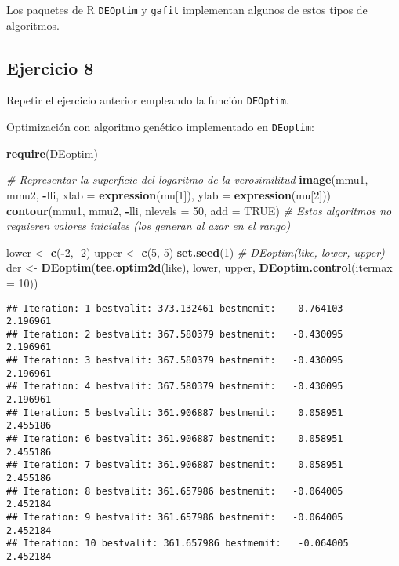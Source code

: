 \documentclass[
]{book}
\newenvironment{Shaded}{\begin{snugshade}}{\end{snugshade}}
\newcommand{\CommentTok}[1]{\textcolor[rgb]{0.56,0.35,0.01}{\textit{#1}}}
\newcommand{\DataTypeTok}[1]{\textcolor[rgb]{0.13,0.29,0.53}{#1}}
\newcommand{\DecValTok}[1]{\textcolor[rgb]{0.00,0.00,0.81}{#1}}
\newcommand{\KeywordTok}[1]{\textcolor[rgb]{0.13,0.29,0.53}{\textbf{#1}}}
\newcommand{\NormalTok}[1]{#1}
\newcommand{\OperatorTok}[1]{\textcolor[rgb]{0.81,0.36,0.00}{\textbf{#1}}}
\newcommand{\OtherTok}[1]{\textcolor[rgb]{0.56,0.35,0.01}{#1}}
\newcommand{\StringTok}[1]{\textcolor[rgb]{0.31,0.60,0.02}{#1}}
\theoremstyle{break}
\theoremstyle{definition}
\theoremstyle{definition}
\theoremstyle{definition}
\theoremstyle{remark}
\begin{document}
Los paquetes de R \texttt{DEOptim} y \texttt{gafit} implementan algunos de estos
tipos de algoritmos.

\hypertarget{ejercicio-8}{%
\subsection{Ejercicio 8}\label{ejercicio-8}}

Repetir el ejercicio anterior empleando la función \texttt{DEOptim}.

Optimización con algoritmo genético implementado en \texttt{DEoptim}:

\begin{Shaded}
\begin{Highlighting}[]
\KeywordTok{require}\NormalTok{(DEoptim)}

\CommentTok{# Representar la superficie del logaritmo de la verosimilitud}
\KeywordTok{image}\NormalTok{(mmu1, mmu2, }\OperatorTok{-}\NormalTok{lli, }\DataTypeTok{xlab =} \KeywordTok{expression}\NormalTok{(mu[}\DecValTok{1}\NormalTok{]), }\DataTypeTok{ylab =} \KeywordTok{expression}\NormalTok{(mu[}\DecValTok{2}\NormalTok{]))}
\KeywordTok{contour}\NormalTok{(mmu1, mmu2, }\OperatorTok{-}\NormalTok{lli, }\DataTypeTok{nlevels =} \DecValTok{50}\NormalTok{, }\DataTypeTok{add =} \OtherTok{TRUE}\NormalTok{)}
\CommentTok{# Estos algoritmos no requieren valores iniciales (los generan al azar en el rango)}

\NormalTok{lower <-}\StringTok{ }\KeywordTok{c}\NormalTok{(}\OperatorTok{-}\DecValTok{2}\NormalTok{, }\DecValTok{-2}\NormalTok{)}
\NormalTok{upper <-}\StringTok{ }\KeywordTok{c}\NormalTok{(}\DecValTok{5}\NormalTok{, }\DecValTok{5}\NormalTok{)}
\KeywordTok{set.seed}\NormalTok{(}\DecValTok{1}\NormalTok{)}
\CommentTok{# DEoptim(like, lower, upper)}
\NormalTok{der <-}\StringTok{ }\KeywordTok{DEoptim}\NormalTok{(}\KeywordTok{tee.optim2d}\NormalTok{(like), lower, upper, }\KeywordTok{DEoptim.control}\NormalTok{(}\DataTypeTok{itermax =} \DecValTok{10}\NormalTok{))}
\end{Highlighting}
\end{Shaded}

\begin{verbatim}
## Iteration: 1 bestvalit: 373.132461 bestmemit:   -0.764103    2.196961
## Iteration: 2 bestvalit: 367.580379 bestmemit:   -0.430095    2.196961
## Iteration: 3 bestvalit: 367.580379 bestmemit:   -0.430095    2.196961
## Iteration: 4 bestvalit: 367.580379 bestmemit:   -0.430095    2.196961
## Iteration: 5 bestvalit: 361.906887 bestmemit:    0.058951    2.455186
## Iteration: 6 bestvalit: 361.906887 bestmemit:    0.058951    2.455186
## Iteration: 7 bestvalit: 361.906887 bestmemit:    0.058951    2.455186
## Iteration: 8 bestvalit: 361.657986 bestmemit:   -0.064005    2.452184
## Iteration: 9 bestvalit: 361.657986 bestmemit:   -0.064005    2.452184
## Iteration: 10 bestvalit: 361.657986 bestmemit:   -0.064005    2.452184
\end{verbatim}
\end{document}
